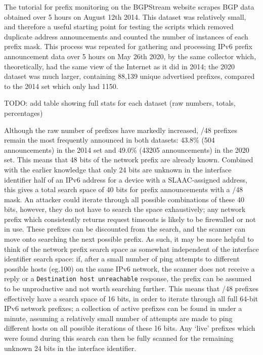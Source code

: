 \documentclass[10pt,sigconf]{acmart}
\begin{document}
The tutorial for prefix monitoring on the BGPStream website scrapes BGP data obtained over 5 hours on August 12th 2014.
This dataset was relatively small, and therefore a useful starting point for testing the scripts which removed duplicate address announcements and counted the number of instances of each prefix mask.
This process was repeated for gathering and processing IPv6 prefix announcement data over 5 hours on May 26th 2020, by the same collector which, theoretically, had the same view of the Internet as it did in 2014;
the 2020 dataset was much larger, containing 88,139 unique advertised prefixes, compared to the 2014 set which only had 1150.

TODO: add table showing full stats for each dataset (raw numbers, totals, percentages)

Although the raw number of prefixes have markedly increased, /48 prefixes remain the most frequently announced in both datasets:
43.8\% (504 announcements) in the 2014 set and 49.0\% (43205 announcements) in the 2020 set.
This means that 48 bits of the network prefix are already known.
Combined with the earlier knowledge that only 24 bits are unknown in the interface identifier half of an IPv6 address for a device with a SLAAC-assigned address, this gives a total search space of 40 bits for prefix announcements with a /48 mask.
An attacker could iterate through all possible combinations of these 40 bits, however, they do not have to search the space exhaustively;
any network prefix which consistently returns request timeouts is likely to be firewalled or not in use.
These prefixes can be discounted from the search, and the scanner can move onto searching the next possible prefix.
As such, it may be more helpful to think of the network prefix search space as somewhat independent of the interface identifier search space:
if, after a small number of ping attempts to different possible hosts (eg.100) on the same IPv6 network, the scanner does not receive a reply or a \texttt{Destination host unreachable} response, the prefix can be assumed to be unproductive and not worth searching further.
This means that /48 prefixes effectively have a search space of 16 bits, in order to iterate through all full 64-bit IPv6 network prefixes;
a collection of active prefixes can be found in under a minute, assuming a relatively small number of attempts are made to ping different hosts on all possible iterations of these 16 bits.
Any `live' prefixes which were found during this search can then be fully scanned for the remaining unknown 24 bits in the interface identifier.
\end{document}
